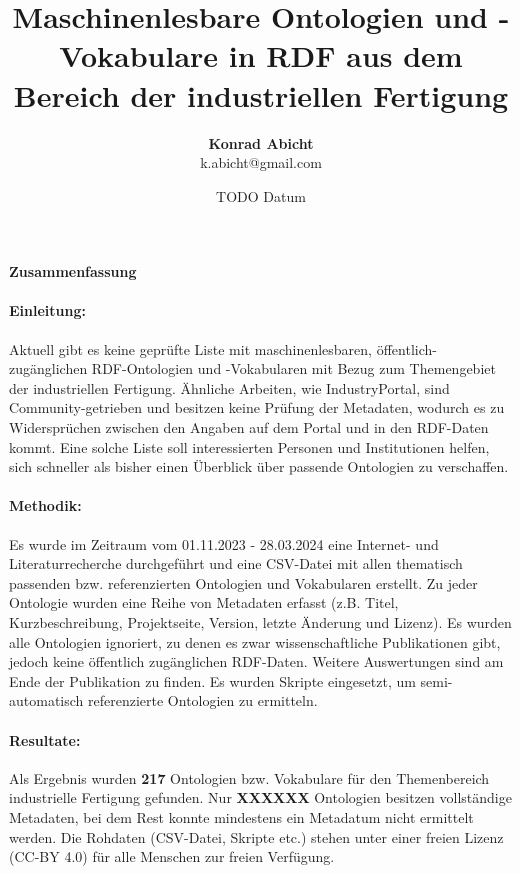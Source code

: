 \documentclass{article}
\title{Maschinenlesbare Ontologien und -Vokabulare in RDF aus dem Bereich der industriellen Fertigung}
\author{\textbf{Konrad Abicht} \\ k.abicht@gmail.com}
\date{TODO Datum}
\begin{document}
\maketitle

\paragraph{{\large Zusammenfassung}}

\paragraph{Einleitung:} Aktuell gibt es keine geprüfte Liste mit maschinenlesbaren, öffentlich-zugänglichen RDF-Ontologien und -Vokabularen mit Bezug zum Themengebiet der industriellen Fertigung.
Ähnliche Arbeiten, wie IndustryPortal, sind Community-getrieben und besitzen keine Prüfung der Metadaten, wodurch es zu Widersprüchen zwischen den Angaben auf dem Portal und in den RDF-Daten kommt.
Eine solche Liste soll interessierten Personen und Institutionen helfen, sich schneller als bisher einen Überblick über passende Ontologien zu verschaffen.

\paragraph{Methodik:} Es wurde im Zeitraum vom 01.11.2023 - 28.03.2024 eine Internet- und Literaturrecherche durchgeführt und eine CSV-Datei mit allen thematisch passenden bzw. referenzierten Ontologien und Vokabularen erstellt.
Zu jeder Ontologie wurden eine Reihe von Metadaten erfasst (z.B. Titel, Kurzbeschreibung, Projektseite, Version, letzte Änderung und Lizenz).
Es wurden alle Ontologien ignoriert, zu denen es zwar wissenschaftliche Publikationen gibt, jedoch keine öffentlich zugänglichen RDF-Daten. Weitere Auswertungen sind am Ende der Publikation zu finden.
Es wurden Skripte eingesetzt, um semi-automatisch referenzierte Ontologien zu ermitteln.

\paragraph{Resultate:} Als Ergebnis wurden \textbf{217} Ontologien bzw. Vokabulare für den Themenbereich industrielle Fertigung gefunden. Nur \textbf{XXXXXX} Ontologien besitzen vollständige Metadaten, bei dem Rest konnte mindestens ein Metadatum nicht ermittelt werden.  Die Rohdaten (CSV-Datei, Skripte etc.) stehen unter einer freien Lizenz (CC-BY 4.0) für alle Menschen zur freien Verfügung.
\end{document}
